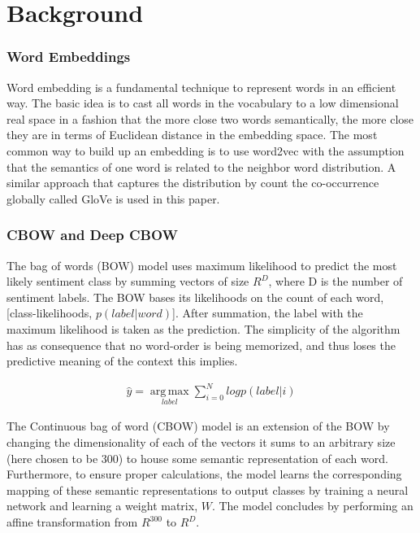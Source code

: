 \section{Background}
\label{sec: background}
\subsubsection{Word Embeddings}
Word embedding is a fundamental technique to represent words in an efficient
way. The basic idea is to cast all words in the vocabulary to a low dimensional
real space in a fashion that the more close two words semantically, the more
close they are in terms of Euclidean distance in the embedding space. The most
common way to build up an embedding is to use
word2vec\cite{mikolov2013distributed} with the assumption that the semantics of
one word is related to the neighbor word distribution. A similar approach that
captures the distribution by count the co-occurrence globally called
GloVe\cite{pennington2014glove} is used in this paper.

\subsubsection{CBOW and Deep CBOW}
The bag of words (BOW) model uses maximum likelihood to predict the most likely
sentiment class by summing vectors of size $R^{D}$, where D is the number of
sentiment labels. The BOW bases its likelihoods on the count of each word,
[class-likelihoods, $p(label|word)$]. After summation, the label with the
maximum likelihood is taken as the prediction. The simplicity of the algorithm
has as consequence that no word-order is being memorized, and thus loses the
predictive meaning of the context this implies.

\begin{align*}
    \hat{y} = \operatorname*{arg\,max}_{label} \sum^{N}_{i=0} log p(label|i)
\end{align*}

The Continuous bag of word (CBOW) model is an extension of the BOW by changing
the dimensionality of each of the vectors it sums to an arbitrary size (here
chosen to be 300) to house some semantic representation of each word.
Furthermore, to ensure proper calculations, the model learns the corresponding
mapping of these semantic representations to output classes by training a neural
network and learning a weight matrix, $W$. The model concludes by performing an
affine transformation from $R^{300}$ to $R^D$.

